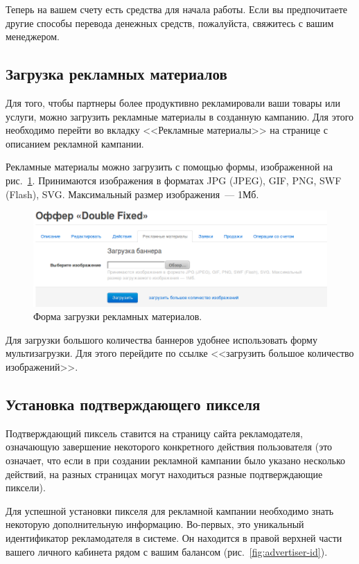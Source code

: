 \documentclass[a4paper,12pt]{article}
\begin{document}
Теперь на вашем счету есть средства для начала работы. Если вы предпочитаете другие способы перевода денежных средств, пожалуйста, свяжитесь с вашим менеджером.

\subsection{Загрузка рекламных материалов}

Для того, чтобы партнеры более продуктивно рекламировали ваши товары или услуги, можно загрузить рекламные материалы в созданную кампанию. Для этого необходимо перейти во вкладку <<Рекламные материалы>> на странице с описанием рекламной кампании.

Рекламные материалы можно загрузить с помощью формы, изображенной на рис.~\ref{fig:materials}. Принимаются изображения в форматах JPG (JPEG), GIF, PNG, SWF (Flash), SVG. Максимальный размер изображения~--- 1Мб.

\begin{figure}[!ht]
\centering
\includegraphics[width=\textwidth]{include/materials.png}
\caption{Форма загрузки рекламных материалов.}
\label{fig:materials}
\end{figure}

Для загрузки большого количества баннеров удобнее использовать форму мультизагрузки. Для этого перейдите по ссылке <<загрузить большое количество изображений>>.

\subsection{Установка подтверждающего пикселя}
\label{ssec:pixel}

Подтверждающий пиксель ставится на страницу сайта рекламодателя, означающую завершение некоторого конкретного действия пользователя (это означает, что если в при создании рекламной кампании было указано несколько действий, на разных страницах могут находиться разные подтверждающие пиксели).

Для успешной установки пикселя для рекламной кампании необходимо знать некоторую дополнительную информацию. Во-первых, это уникальный идентификатор рекламодателя в системе. Он находится в правой верхней части вашего личного кабинета рядом с вашим балансом (рис.~\ref{fig:advertiser-id}).
\end{document}
